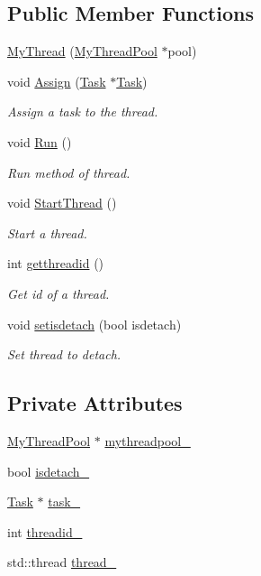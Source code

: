 \subsection*{Public Member Functions}
\begin{DoxyCompactItemize}
\item 
\hyperlink{classMyThread_a43018638650ded91b9a511132a96f778}{My\+Thread} (\hyperlink{classMyThreadPool}{My\+Thread\+Pool} $\ast$pool)
\item 
void \hyperlink{classMyThread_adadb69384a54610a8c7affebcfbb0133}{Assign} (\hyperlink{classTask}{Task} $\ast$\hyperlink{classTask}{Task})
\begin{DoxyCompactList}\small\item\em Assign a task to the thread. \end{DoxyCompactList}\item 
void \hyperlink{classMyThread_a3f9f6783bbe4de36b1248cc5a493366a}{Run} ()
\begin{DoxyCompactList}\small\item\em Run method of thread. \end{DoxyCompactList}\item 
void \hyperlink{classMyThread_a939eae525c8a51ccb2116b940197185a}{Start\+Thread} ()
\begin{DoxyCompactList}\small\item\em Start a thread. \end{DoxyCompactList}\item 
int \hyperlink{classMyThread_a147606088b0b0479f706bf23dbb77a50}{getthreadid} ()
\begin{DoxyCompactList}\small\item\em Get id of a thread. \end{DoxyCompactList}\item 
void \hyperlink{classMyThread_a619a32097b4bd211d7238f15f3e5f2c3}{setisdetach} (bool isdetach)
\begin{DoxyCompactList}\small\item\em Set thread to detach. \end{DoxyCompactList}\end{DoxyCompactItemize}
\subsection*{Private Attributes}
\begin{DoxyCompactItemize}
\item 
\hyperlink{classMyThreadPool}{My\+Thread\+Pool} $\ast$ \hyperlink{classMyThread_a74d5590119c9211bd47b2ec9adaafc02}{mythreadpool\+\_\+}
\item 
bool \hyperlink{classMyThread_ad64c87d4924eab30ae36bed5d3560dfc}{isdetach\+\_\+}
\item 
\hyperlink{classTask}{Task} $\ast$ \hyperlink{classMyThread_a1013bd0ea254f26c337d8e35dd1c5762}{task\+\_\+}
\item 
int \hyperlink{classMyThread_a4ab4d45dabcb1c302ad03b9b8dbda282}{threadid\+\_\+}
\item 
std\+::thread \hyperlink{classMyThread_afb1913aba4cad629b8c6e1de298abfea}{thread\+\_\+}
\end{DoxyCompactItemize}
